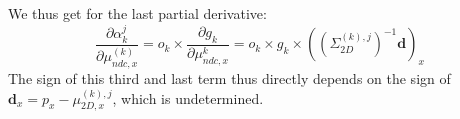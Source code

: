 \begin{itemize}
We thus get for the last partial derivative: 
\begin{equation}
    \frac{\partial \alpha_{k}^{j}}{\partial \mu^{(k)}_{ndc,x}} =  o_{k} \times \frac{\partial g_{k}}{\partial \mu^{k}_{ndc,x}} = o_{k} \times g_{k} \times ((\Sigma_{2D}^{(k),j})^{-1}\mathbf{d})_{x}
\end{equation}
The sign of this third and last term thus directly depends on the sign of $\mathbf{d}_{x} = p_x - \mu_{2D,x}^{(k),j}$, which is undetermined. 

\end{itemize}






